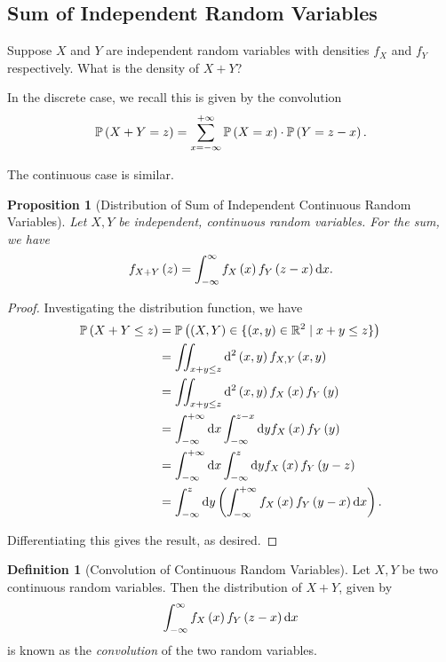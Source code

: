 \documentclass{article}
\newtheorem{proposition}[theorem]{Proposition}
\theoremstyle{definition}
\newtheorem{definition}[theorem]{Definition}
\theoremstyle{remark}
\newcommand{\RR}{\mathbb{R}}
\newcommand{\Prob}{\mathbb{P}}
\newcommand{\plusinfty}{+\infty}
\newcommand{\minusinfty}{-\infty}
\newcommand{\set}[2]{\{#1\mid #2\}}
\begin{document}
\subsection{Sum of Independent Random Variables}

Suppose \(X\) and \(Y\) are independent random variables with densities \(f_X\) and \(f_Y\) respectively. What is the density of \(X + Y\)?

In the discrete case, we recall this is given by the convolution
\[
    \Prob\pqty{X + Y = z} = \sum_{x = \minusinfty}^{\plusinfty} \Prob\pqty{X = x} \cdot \Prob\pqty{Y = z - x}.
\]

The continuous case is similar.

\begin{proposition}[Distribution of Sum of Independent Continuous Random Variables]
    \label{prop:dist-sum-indp-crv}%
    Let \(X, Y\) be independent, continuous random variables. For the sum, we have
    \[
        f_{X + Y}\pqty{z} = \int_{\minusinfty}^{\infty} f_X\pqty{x} f_Y\pqty{z - x} \dd{x}.
    \]
\end{proposition}

\begin{proof}
    Investigating the distribution function, we have
    \begin{align*}
        \Prob\pqty{X + Y \leq z} &= \Prob\pqty{\pqty{X, Y} \in \set{\pqty{x, y} \in \RR^2}{x + y \leq z}} \\
        &= \iint_{x + y \leq z} \dd[2]{\pqty{x, y}} f_{X, Y} \pqty{x, y} \\
        &= \iint_{x + y \leq z} \dd[2]{\pqty{x, y}} f_{X} \pqty{x} f_{Y} \pqty{y} \\
        &= \int_{\minusinfty}^{\plusinfty} \dd{x} \int_{\minusinfty}^{z - x} \dd{y} f_X\pqty{x} f_Y\pqty{y} \\
        &= \int_{\minusinfty}^{\plusinfty} \dd{x} \int_{\minusinfty}^{z} \dd{y} f_X\pqty{x} f_Y\pqty{y - z} \\
        &= \int_{\minusinfty}^{z} \dd{y} \pqty{\int_{\minusinfty}^{\plusinfty} f_X\pqty{x} f_Y\pqty{y - x} \dd{x}}.
    \end{align*}

    Differentiating this gives the result, as desired.
\end{proof}

\begin{definition}[Convolution of Continuous Random Variables]
    \label{def:convolution-crv}%
    Let \(X, Y\) be two continuous random variables. Then the distribution of \(X + Y\), given by
    \[
        \int_{\minusinfty}^{\infty} f_X\pqty{x} f_Y\pqty{z - x} \dd{x}
    \]
    is known as the \emph{convolution} of the two random variables.
\end{definition}
\end{document}
